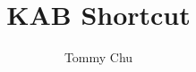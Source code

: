 \documentclass[a4paper]{article}
\title{KAB Shortcut}
\author{Tommy Chu}
\date{}
\begin{document}
\twocolumn
\maketitle
\tableofcontents


\end{document}
